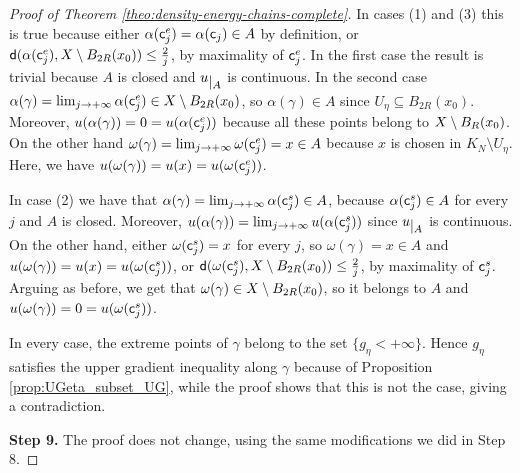 \documentclass[10pt,a4paper]{amsart}
\newcommand{\X}{{\rm X}}
\newcommand{\restr}[1]{\lower3pt\hbox{$|_{#1}$}}
\newcommand{\sfc}{{\sf c}}
\newcommand{\sfd}{{\sf d}}
\begin{document}
\begin{proof}[Proof of Theorem \ref{theo:density-energy-chains-complete}]
    In cases (1) and (3) this is true because either $\alpha(\sfc_j^e) = \alpha(\sfc_j) \in A$ by definition, or $\sfd(\alpha(\sfc_j^e), \X \setminus B_{2R}(x_0)) \le \frac{2}{j}$, by maximality of $\sfc_j^e$. In the first case the result is trivial because $A$ is closed and $u\restr{A}$ is continuous. In the second case $\alpha(\gamma) = \lim_{j\to +\infty} \alpha(\sfc_j^e) \in \X \setminus B_{2R}(x_0)$, so $\alpha(\gamma)\in A$ since $U_\eta \subseteq B_{2R}(x_0)$. Moreover, $u(\alpha(\gamma)) = 0 = u(\alpha(\sfc_j^e))$ because all these points belong to $\X \setminus B_R(x_0)$. On the other hand $\omega(\gamma) = \lim_{j\to +\infty} \omega(\sfc_j^e) = x \in A$ because $x$ is chosen in $K_N\setminus U_\eta$. Here, we have $u(\omega(\gamma)) = u(x) = u(\omega(\sfc_j^e))$.   
    
    In case (2) we have that $\alpha(\gamma) = \lim_{j\to +\infty} \alpha(\sfc_j^s) \in A$, because $\alpha(\sfc_j^s) \in A$ for every $j$ and $A$ is closed. Moreover, $u(\alpha(\gamma)) = \lim_{j\to +\infty} u(\alpha(\sfc_j^s))$ since $u\restr{A}$ is continuous. On the other hand, either $\omega(\sfc_j^s) = x$ for every $j$, so $\omega(\gamma) = x \in A$ and $u(\omega(\gamma)) = u(x) = u(\omega(\sfc_j^s))$, or $\sfd(\omega(\sfc_j^s), \X \setminus B_{2R}(x_0)) \le \frac{2}{j}$, by maximality of $\sfc_j^s$. Arguing as before, we get that $\omega(\gamma) \in \X \setminus B_{2R}(x_0)$, so it belongs to $A$ and $u(\omega(\gamma)) = 0 = u(\omega(\sfc_j^s))$. 
    
    In every case, the extreme points of $\gamma$ belong to the set $\{g_\eta < +\infty\}$. Hence $g_\eta$ satisfies the upper gradient inequality along $\gamma$ because of Proposition \ref{prop:UGeta_subset_UG}, while the proof shows that this is not the case, giving a contradiction.

    {\bf Step 9.} The proof does not change, using the same modifications we did in Step 8.
\end{proof}
\end{document}
